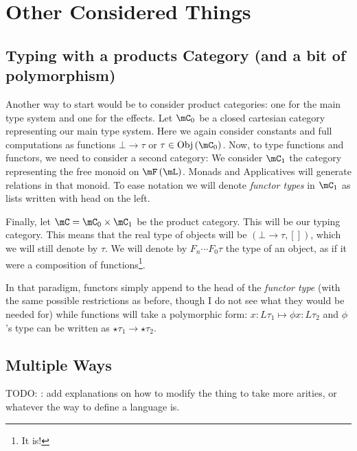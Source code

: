 \section{Other Considered Things}
\subsection{Typing with a products Category (and a bit of polymorphism)}
\label{app:prodcat}
Another way to start would be to consider product categories: one for the main type system and one for the effects.
Let $\mC_{0}$ be a closed cartesian category representing our main type system.
Here we again consider constants and full computations as functions $\bot \to \tau$ or $\tau \in \mathrm{Obj}\left( \mC_{0} \right)$.
Now, to type functions and functors, we need to consider a second category:
We consider $\mC_{1}$ the category representing the free monoid on $\mF\left( \mL \right)$.
Monads and Applicatives will generate relations in that monoid.
To ease notation we will denote \emph{functor types} in $\mC_{1}$ as lists written with head on the left.

Finally, let $\mC = \mC_{0} \times \mC_{1}$ be the product category. This will be our typing category.
This means that the real type of objects will be $\left( \bot \to \tau, [] \right)$, which we will still denote by $\tau$.
We will denote by $F_{n} \cdots F_{0} \tau$ the type of an object, as if it were a composition of functions\footnote{It is!}.

In that paradigm, functors simply append to the head of the \emph{functor type} (with the same possible restrictions as before, though I do not see what they would be needed for) while functions will take a polymorphic form:
$x: L\tau_{1} \mapsto \phi x: L\tau_{2}$ and $\phi$'s type can be written as $\star\tau_{1} \to \star\tau_{2}$.

\subsection{Multiple Ways}
\label{app:arities-and-denots}
TODO: : add explanations on how to modify the thing to take more arities,
or whatever the way to define a language is.
